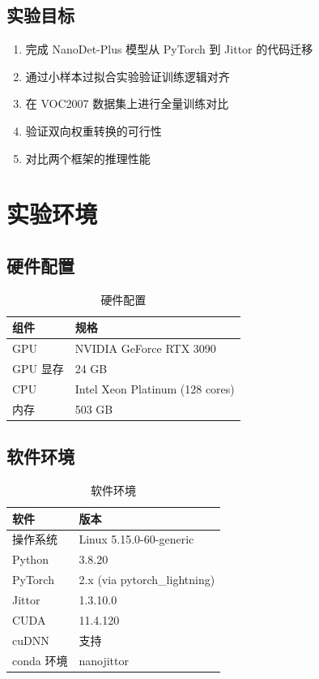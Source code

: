 \documentclass[12pt,a4paper]{article}
\begin{document}
\subsection{实验目标}

\begin{enumerate}
    \item 完成 NanoDet-Plus 模型从 PyTorch 到 Jittor 的代码迁移
    \item 通过小样本过拟合实验验证训练逻辑对齐
    \item 在 VOC2007 数据集上进行全量训练对比
    \item 验证双向权重转换的可行性
    \item 对比两个框架的推理性能
\end{enumerate}

\section{实验环境}

\subsection{硬件配置}

\begin{table}[H]
\centering
\caption{硬件配置}
\begin{tabular}{ll}
\toprule
\textbf{组件} & \textbf{规格} \\
\midrule
GPU & NVIDIA GeForce RTX 3090 \\
GPU 显存 & 24 GB \\
CPU & Intel Xeon Platinum (128 cores) \\
内存 & 503 GB \\
\bottomrule
\end{tabular}
\end{table}

\subsection{软件环境}

\begin{table}[H]
\centering
\caption{软件环境}
\begin{tabular}{ll}
\toprule
\textbf{软件} & \textbf{版本} \\
\midrule
操作系统 & Linux 5.15.0-60-generic \\
Python & 3.8.20 \\
PyTorch & 2.x (via pytorch\_lightning) \\
Jittor & 1.3.10.0 \\
CUDA & 11.4.120 \\
cuDNN & 支持 \\
conda 环境 & nanojittor \\
\bottomrule
\end{tabular}
\end{table}
\end{document}
